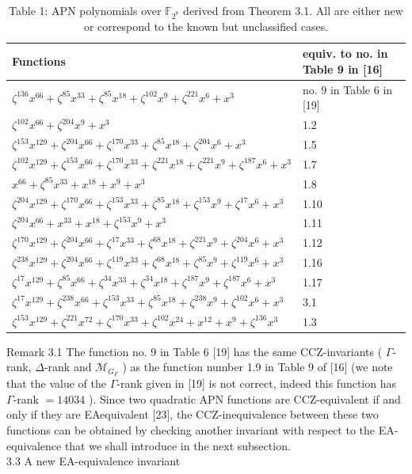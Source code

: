 \documentclass[10pt]{article}
\begin{document}
\begin{table}[h]
\begin{center}
\captionsetup{labelformat=empty}
\caption{Table 1: APN polynomials over $\mathbb{F}_{2^{8}}$ derived from Theorem 3.1. All are either new or correspond to the known but unclassified cases.}
\begin{tabular}{|l|l|}
\hline
Functions & equiv. to no. in Table 9 in [16] \\
\hline
$\zeta^{136} x^{66}+\zeta^{85} x^{33}+\zeta^{85} x^{18}+\zeta^{102} x^{9}+\zeta^{221} x^{6}+x^{3}$ & no. 9 in Table 6 in [19] \\
\hline
$\zeta^{102} x^{66}+\zeta^{204} x^{9}+x^{3}$ & 1.2 \\
\hline
$\zeta^{153} x^{129}+\zeta^{204} x^{66}+\zeta^{170} x^{33}+\zeta^{85} x^{18}+\zeta^{204} x^{6}+x^{3}$ & 1.5 \\
\hline
$\zeta^{102} x^{129}+\zeta^{153} x^{66}+\zeta^{170} x^{33}+\zeta^{221} x^{18}+\zeta^{221} x^{9}+\zeta^{187} x^{6}+x^{3}$ & 1.7 \\
\hline
$x^{66}+\zeta^{85} x^{33}+x^{18}+x^{9}+x^{3}$ & 1.8 \\
\hline
$\zeta^{204} x^{129}+\zeta^{170} x^{66}+\zeta^{153} x^{33}+\zeta^{85} x^{18}+\zeta^{153} x^{9}+\zeta^{17} x^{6}+x^{3}$ & 1.10 \\
\hline
$\zeta^{204} x^{66}+x^{33}+x^{18}+\zeta^{153} x^{9}+x^{3}$ & 1.11 \\
\hline
$\zeta^{170} x^{129}+\zeta^{204} x^{66}+\zeta^{17} x^{33}+\zeta^{68} x^{18}+\zeta^{221} x^{9}+\zeta^{204} x^{6}+x^{3}$ & 1.12 \\
\hline
$\zeta^{238} x^{129}+\zeta^{204} x^{66}+\zeta^{119} x^{33}+\zeta^{68} x^{18}+\zeta^{85} x^{9}+\zeta^{119} x^{6}+x^{3}$ & 1.16 \\
\hline
$\zeta^{17} x^{129}+\zeta^{85} x^{66}+\zeta^{34} x^{33}+\zeta^{34} x^{18}+\zeta^{187} x^{9}+\zeta^{187} x^{6}+x^{3}$ & 1.17 \\
\hline
$\zeta^{17} x^{129}+\zeta^{238} x^{66}+\zeta^{153} x^{33}+\zeta^{85} x^{18}+\zeta^{238} x^{9}+\zeta^{102} x^{6}+x^{3}$ & 3.1 \\
\hline
$\zeta^{153} x^{129}+\zeta^{221} x^{72}+\zeta^{170} x^{33}+\zeta^{102} x^{24}+x^{12}+x^{9}+\zeta^{136} x^{3}$ & 1.3 \\
\hline
\end{tabular}
\end{center}
\end{table}

Remark 3.1 The function no. 9 in Table 6 [19] has the same CCZ-invariants ( $\Gamma$-rank, $\Delta$-rank and $\mathscr{M}_{G_{F}}$ ) as the function number 1.9 in Table 9 of [16] (we note that the value of the $\Gamma$-rank given in [19] is not correct, indeed this function has $\Gamma$-rank $=14034$ ). Since two quadratic APN functions are CCZ-equivalent if and only if they are EAequivalent [23], the CCZ-inequivalence between these two functions can be obtained by checking another invariant with respect to the EA-equivalence that we shall introduce in the next subsection.\\
3.3 A new EA-equivalence invariant
\end{document}

